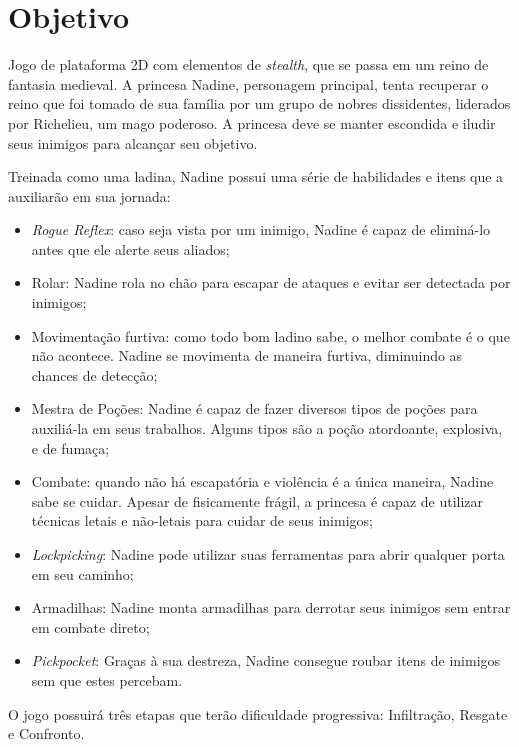 \AddToShipoutPicture{\BackgroundPic}

\chapter{Objetivo}

Jogo de plataforma 2D com elementos de \emph{stealth}, que se passa em um reino de fantasia medieval. A princesa Nadine, personagem principal, tenta recuperar o reino que foi tomado de sua família por um grupo de nobres dissidentes, liderados por Richelieu, um mago poderoso. A princesa deve se manter escondida e iludir seus inimigos para alcançar seu objetivo.

Treinada como uma ladina, Nadine possui uma série de habilidades e itens que a auxiliarão em sua jornada:
\begin{itemize}
	\item {\emph{Rogue Reflex}: caso seja vista por um inimigo, Nadine é capaz de eliminá-lo antes que ele alerte seus aliados;}
	\item {Rolar: Nadine rola no chão para escapar de ataques e evitar ser detectada por inimigos;}
	\item {Movimentação furtiva: como todo bom ladino sabe, o melhor combate é o que não acontece. Nadine se movimenta de maneira furtiva, diminuindo as chances de detecção;}
	\item {Mestra de Poções: Nadine é capaz de fazer diversos tipos de poções para auxiliá-la em seus trabalhos. Alguns tipos são a poção atordoante, explosiva, e de fumaça;}
	\item {Combate: quando não há escapatória e violência é a única maneira, Nadine sabe se cuidar. Apesar de fisicamente frágil, a princesa é capaz de utilizar técnicas letais e não-letais para cuidar de seus inimigos;}
	\item {\emph{Lockpicking}}: Nadine pode utilizar suas ferramentas para abrir qualquer porta em seu caminho;
	\item {Armadilhas: Nadine monta armadilhas para derrotar seus inimigos sem entrar em combate direto;}
	\item {\emph{Pickpocket}: Graças à sua destreza, Nadine consegue roubar itens de inimigos sem que estes percebam.}
\end{itemize}

O jogo possuirá três etapas que terão dificuldade progressiva: Infiltração, Resgate e Confronto.

